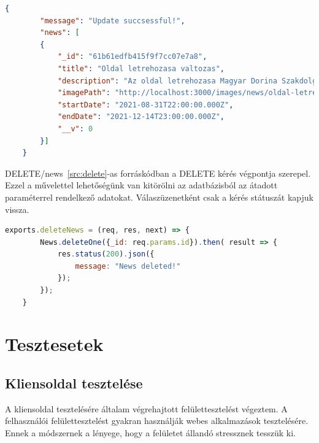\begin{lstlisting}[language={JSON}]
	{
		"message": "Update succsessful!",
		"news": [
		{
			"_id": "61b61edfb415f9f7cc07e7a8",
			"title": "Oldal letrehozasa valtozas",
			"description": "Az oldal letrehozasa Magyar Dorina Szakdolgozata elkeszitese celjabol tortent. Jelenleg ez az oldal nem uzemel! Nem kerulnek ertekesitesre azok a termekek, amik az aruhazban talalhatoak! Ha tovabbi kerdese lenne a Rolunk feliratu menun keresztul kapcsolatba lephet velem es minden kerdesre email formajaban valaszolok. Megerteseteket elore is koszonom!",
			"imagePath": "http://localhost:3000/images/news/oldal-letrehozasa-1639325407045.png",
			"startDate": "2021-08-31T22:00:00.000Z",
			"endDate": "2021-12-14T23:00:00.000Z",
			"__v": 0
		}]
	}
\end{lstlisting}

DELETE/news~\ref{src:delete}-as forráskódban a DELETE kérés végpontja szerepel. Ezzel a művelettel lehetőségünk van kitörölni az adatbázisból az átadott paraméterrel rendelkező adatokat. Válaszüzenetként csak a kérés státuszát kapjuk vissza.

\begin{lstlisting}[language=JavaScript]
	exports.deleteNews = (req, res, next) => {
		News.deleteOne({_id: req.params.id}).then( result => {
			res.status(200).json({
				message: "News deleted!"
			});
		});
	}
\end{lstlisting}

\section{Tesztesetek}

\subsection{Kliensoldal tesztelése}
A kliensoldal tesztelésére általam végrehajtott felülettesztelést végeztem. A felhasználói felülettesztelést gyakran használják webes alkalmazások tesztelésére. Ennek a módszernek a lényege, hogy a felületet állandó stressznek tesszük ki.

